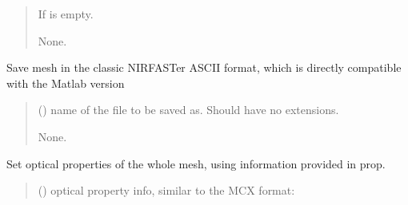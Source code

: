 \documentclass[letterpaper,10pt,english]{sphinxmanual}
\begin{document}
\begin{fulllineitems}
\begin{fulllineitems}
\begin{quote}
\begin{description}
\begin{itemize}
\end{itemize}

\sphinxAtStartPar
{} \textendash{} If  is empty.

\sphinxAtStartPar
None.

\end{description}\end{quote}

\end{fulllineitems}


\begin{fulllineitems}
\label{\detokenize{_autosummary/nirfasterff.base.stnd_mesh.stndmesh:nirfasterff.base.stnd_mesh.stndmesh.save_nirfast}}
\pysigstartsignatures
\pysiglinewithargsret
{}
{}
{}
\pysigstopsignatures
\sphinxAtStartPar
Save mesh in the classic NIRFASTer ASCII format, which is directly compatible with the Matlab version
\begin{quote}\begin{description}
\sphinxAtStartPar
{} () \textendash{} name of the file to be saved as. Should have no extensions.

\sphinxAtStartPar
None.

\end{description}\end{quote}

\end{fulllineitems}


\begin{fulllineitems}
\label{\detokenize{_autosummary/nirfasterff.base.stnd_mesh.stndmesh:nirfasterff.base.stnd_mesh.stndmesh.set_prop}}
\pysigstartsignatures
\pysiglinewithargsret
{}
{}
{}
\pysigstopsignatures
\sphinxAtStartPar
Set optical properties of the whole mesh, using information provided in prop.
\begin{quote}\begin{description}
\sphinxAtStartPar
{} () \textendash{} 
\sphinxAtStartPar
optical property info, similar to the MCX format:


\end{description}
\end{quote}
\end{fulllineitems}
\end{fulllineitems}
\end{document}
